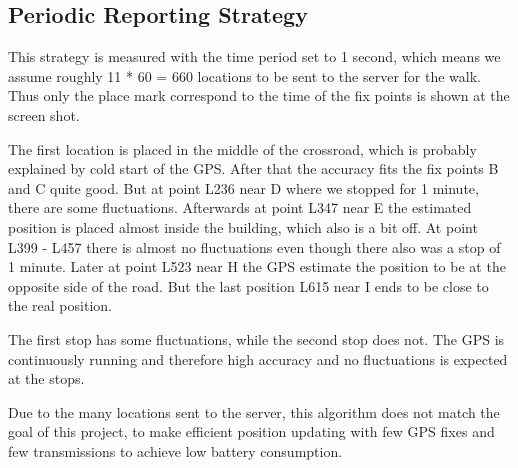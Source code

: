 \subsection{Periodic Reporting Strategy}
This strategy is measured with the time period set to 1 second, which means we assume roughly 11 * 60 = 660 locations to be sent to the server for the walk. Thus only the place mark correspond to the time of the fix points is shown at the screen shot. 

The first location is placed in the middle of the crossroad, which is probably explained by cold start of the GPS. After that the accuracy fits the fix points B and C quite good. But at point L236 near D where we stopped for 1 minute, there are some fluctuations. Afterwards at point L347 near E the estimated position is placed almost inside the building, which also is a bit off. At point L399 - L457 there is almost no fluctuations even though there also was a stop of 1 minute. Later at point L523 near H the GPS estimate the position to be at the opposite side of the road. But the last position L615 near I ends to be close to the real position.

The first stop has some fluctuations, while the second stop does not. The GPS is continuously running and therefore high accuracy and no fluctuations is expected at the stops.

Due to the many locations sent to the server, this algorithm does not match the goal of this project, to make efficient position updating with few GPS fixes and few transmissions to achieve low battery consumption.
